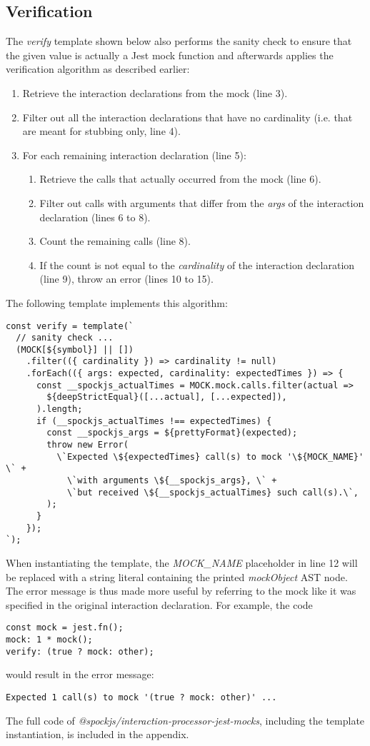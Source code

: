 \subsection{Verification}
The \textit{verify} template shown below also performs the sanity check
to ensure that the given value is actually a Jest mock function
and afterwards applies the verification algorithm as described earlier:
\begin{enumerate}
  \item Retrieve the interaction declarations from the mock (line 3).
  \item Filter out all the interaction declarations that have no cardinality
    (i.e. that are meant for stubbing only, line 4).
  \item For each remaining interaction declaration (line 5):
    \begin{enumerate}
      \item Retrieve the calls that actually occurred from the mock (line 6).
      \item Filter out calls with arguments that differ from
        the \textit{args} of the interaction declaration (lines 6 to 8).
      \item Count the remaining calls (line 8).
      \item If the count is not equal to
        the \textit{cardinality} of the interaction declaration (line 9),
        throw an error (lines 10 to 15).
    \end{enumerate}
\end{enumerate}

The following template implements this algorithm:
\begin{verbatim}
const verify = template(`
  // sanity check ...
  (MOCK[${symbol}] || [])
    .filter(({ cardinality }) => cardinality != null)
    .forEach(({ args: expected, cardinality: expectedTimes }) => {
      const __spockjs_actualTimes = MOCK.mock.calls.filter(actual =>
        ${deepStrictEqual}([...actual], [...expected]),
      ).length;
      if (__spockjs_actualTimes !== expectedTimes) {
        const __spockjs_args = ${prettyFormat}(expected);
        throw new Error(
          \`Expected \${expectedTimes} call(s) to mock '\${MOCK_NAME}' \` +
            \`with arguments \${__spockjs_args}, \` +
            \`but received \${__spockjs_actualTimes} such call(s).\`,
        );
      }
    });
`);
\end{verbatim}

When instantiating the template,
the \textit{MOCK\_NAME} placeholder in line 12
will be replaced with a string literal
containing the printed
\textit{mockObject} AST node.
The error message is thus made more useful
by referring to the mock like it was specified
in the original interaction declaration.
For example, the code
\begin{verbatim}
const mock = jest.fn();
mock: 1 * mock();
verify: (true ? mock: other);
\end{verbatim}
would result in the error message:
\begin{verbatim}
Expected 1 call(s) to mock '(true ? mock: other)' ...
\end{verbatim}

The full code of \textit{@spockjs/interaction-processor-jest-mocks},
including the template instantiation,
is included in the appendix.
